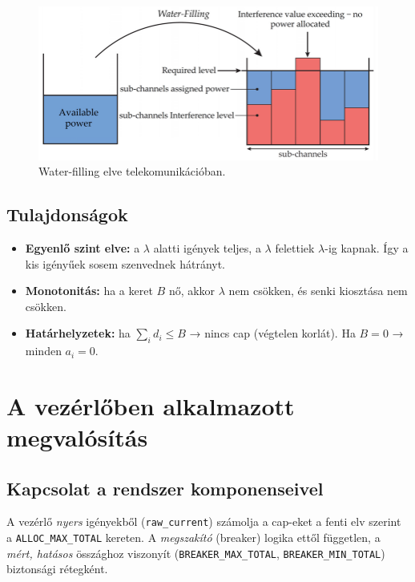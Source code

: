 \begin{figure}
    \centering
    \includegraphics[width=1\textwidth]{figures/Principle-of-Water-Filling-algorithm-76.png}
    \caption{Water-filling elve telekomunikációban. \cite{Slacik2021Sensors}}
    \label{fig:siemens-ems}
\end{figure}

\subsection{Tulajdonságok}
\begin{itemize}
  \item \textbf{Egyenlő szint elve:} a \(\lambda\) alatti igények teljes, a \(\lambda\) 
  felettiek \(\lambda\)-ig kapnak. Így a kis igényűek sosem szenvednek hátrányt.
  \item \textbf{Monotonitás:} ha a keret \(B\) nő, akkor \(\lambda\) nem csökken, és senki kiosztása nem csökken.
  \item \textbf{Határhelyzetek:} ha \(\sum_i d_i \le B\) → nincs cap (végtelen korlát). Ha \(B=0\) → minden \(a_i=0\).
\end{itemize}

\section{A vezérlőben alkalmazott megvalósítás}

\subsection{Kapcsolat a rendszer komponenseivel}
A vezérlő \emph{nyers} igényekből (\texttt{raw\_current}) számolja a cap-eket a fenti elv szerint 
a \texttt{ALLOC\_MAX\_TOTAL} kereten. A \emph{megszakító} (breaker) logika ettől független, 
a \emph{mért, hatásos} összághoz viszonyít (\texttt{BREAKER\_MAX\_TOTAL}, \texttt{BREAKER\_MIN\_TOTAL}) 
biztonsági rétegként.

